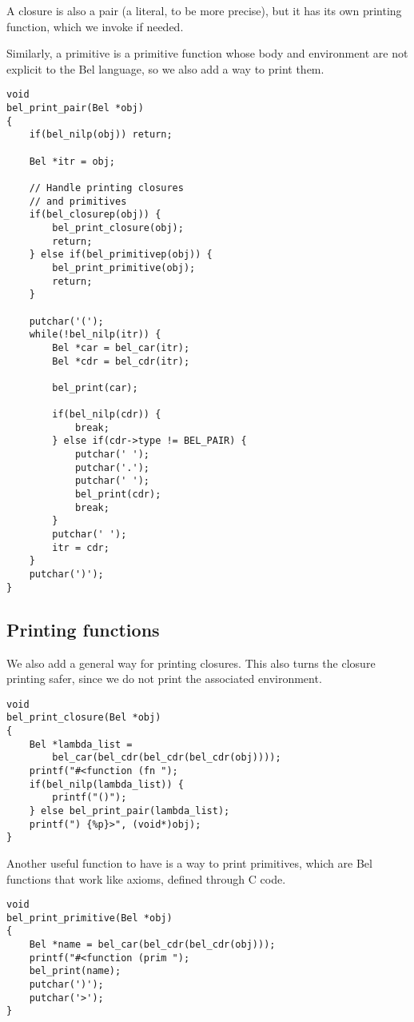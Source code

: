 \documentclass[openright,a4paper,twoside,12pt]{memoir}
\begin{document}
A closure is also  a pair (a literal, to be more  precise), but it has
its own printing function, which we invoke if needed.

Similarly,  a  primitive  is  a  primitive  function  whose  body  and
environment are not explicit to the Bel language, so we also add a way
to print them.

\begin{verbatim}
void
bel_print_pair(Bel *obj)
{
    if(bel_nilp(obj)) return;

    Bel *itr = obj;
    
    // Handle printing closures
    // and primitives
    if(bel_closurep(obj)) {
        bel_print_closure(obj);
        return;
    } else if(bel_primitivep(obj)) {
        bel_print_primitive(obj);
        return;
    }

    putchar('(');
    while(!bel_nilp(itr)) {
        Bel *car = bel_car(itr);
        Bel *cdr = bel_cdr(itr);

        bel_print(car);
        
        if(bel_nilp(cdr)) {
            break;
        } else if(cdr->type != BEL_PAIR) {
            putchar(' ');
            putchar('.');
            putchar(' ');
            bel_print(cdr);
            break;
        }
        putchar(' ');
        itr = cdr;
    }
    putchar(')');
}
\end{verbatim}

\subsection{Printing functions}
\label{sec:org82c25e8}

We also add  a general way for printing closures.  This also turns the
closure  printing  safer,  since  we   do  not  print  the  associated
environment.

\begin{verbatim}
void
bel_print_closure(Bel *obj)
{
    Bel *lambda_list =
        bel_car(bel_cdr(bel_cdr(bel_cdr(obj))));
    printf("#<function (fn ");
    if(bel_nilp(lambda_list)) {
        printf("()");
    } else bel_print_pair(lambda_list);
    printf(") {%p}>", (void*)obj);
}
\end{verbatim}

Another useful  function to have is  a way to print  primitives, which
are Bel functions that work like axioms, defined through C code.

\begin{verbatim}
void
bel_print_primitive(Bel *obj)
{
    Bel *name = bel_car(bel_cdr(bel_cdr(obj)));
    printf("#<function (prim ");
    bel_print(name);
    putchar(')');
    putchar('>');
}
\end{verbatim}
\end{document}
